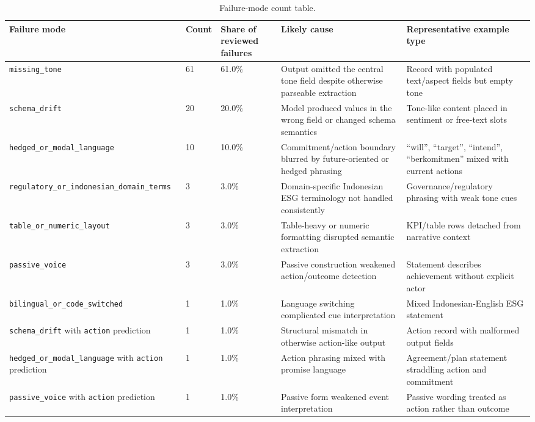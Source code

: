 \begin{table}[htbp]
\centering
\caption{Failure-mode count table.}
\label{tab:failure-mode-count-table}
\footnotesize
\setlength{\tabcolsep}{4pt}
\renewcommand{\arraystretch}{1.15}
\begin{tabularx}{\linewidth}{|X|X|X|X|X|}
\hline
\textbf{Failure mode} & \textbf{Count} & \textbf{Share of reviewed failures} & \textbf{Likely cause} & \textbf{Representative example type} \\ \hline
\texttt{missing\_tone} & 61 & 61.0\% & Output omitted the central tone field despite otherwise parseable extraction & Record with populated text/aspect fields but empty tone \\ \hline
\texttt{schema\_drift} & 20 & 20.0\% & Model produced values in the wrong field or changed schema semantics & Tone-like content placed in sentiment or free-text slots \\ \hline
\texttt{hedged\_or\_modal\_language} & 10 & 10.0\% & Commitment/action boundary blurred by future-oriented or hedged phrasing & “will”, “target”, “intend”, “berkomitmen” mixed with current actions \\ \hline
\texttt{regulatory\_or\_indonesian\_domain\_terms} & 3 & 3.0\% & Domain-specific Indonesian ESG terminology not handled consistently & Governance/regulatory phrasing with weak tone cues \\ \hline
\texttt{table\_or\_numeric\_layout} & 3 & 3.0\% & Table-heavy or numeric formatting disrupted semantic extraction & KPI/table rows detached from narrative context \\ \hline
\texttt{passive\_voice} & 3 & 3.0\% & Passive construction weakened action/outcome detection & Statement describes achievement without explicit actor \\ \hline
\texttt{bilingual\_or\_code\_switched} & 1 & 1.0\% & Language switching complicated cue interpretation & Mixed Indonesian-English ESG statement \\ \hline
\texttt{schema\_drift} with \texttt{action} prediction & 1 & 1.0\% & Structural mismatch in otherwise action-like output & Action record with malformed output fields \\ \hline
\texttt{hedged\_or\_modal\_language} with \texttt{action} prediction & 1 & 1.0\% & Action phrasing mixed with promise language & Agreement/plan statement straddling action and commitment \\ \hline
\texttt{passive\_voice} with \texttt{action} prediction & 1 & 1.0\% & Passive form weakened event interpretation & Passive wording treated as action rather than outcome \\ \hline
\end{tabularx}
\end{table}

